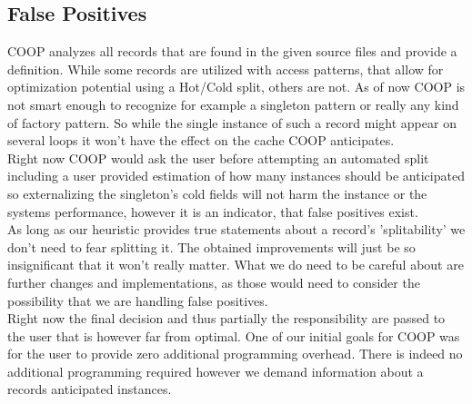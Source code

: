 \subsection{False Positives}
COOP analyzes all records that are found in the given source files and provide a definition. While some records are utilized with access patterns, that allow for optimization potential using a Hot/Cold split, others are not. As of now COOP is not smart enough to recognize for example a singleton pattern or really any kind of factory pattern. So while the single instance of such a record might appear on several loops it won't have the effect on the cache COOP anticipates.\\
Right now COOP would ask the user before attempting an automated split including a user provided estimation of how many instances should be anticipated so externalizing the singleton's cold fields will not harm the instance or the systems performance, however it is an indicator, that false positives exist.\\
As long as our heuristic provides true statements about a record's 'splitability' we don't need to fear splitting it. The obtained improvements will just be so insignificant that it won't really matter. What we do need to be careful about are further changes and implementations, as those would need to consider the possibility that we are handling false positives.\\
Right now the final decision and thus partially the responsibility are passed to the user that is however far from optimal. One of our initial goals for COOP was for the user to provide zero additional programming overhead. There is indeed no additional programming required however we demand information about a records anticipated instances.

